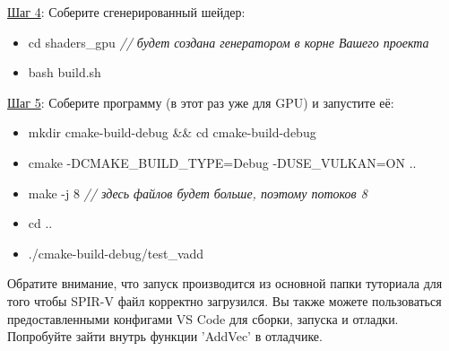 \documentclass[11pt,fleqn,english,russian]{report} %
\begin{document}
\vspace*{5px}
\noindent\underline{Шаг 4}: Соберите сгенерированный шейдер:
\begin{itemize}
\item cd shaders\_gpu \textit{// будет создана генератором в корне Вашего проекта} 
\item bash build.sh
\end{itemize}

\vspace*{5px}
\noindent\underline{Шаг 5}: Соберите программу (в этот раз уже для GPU) и запустите её:
\begin{itemize}
	\item mkdir cmake-build-debug \&\& cd cmake-build-debug
	\item cmake -DCMAKE\_BUILD\_TYPE=Debug -DUSE\_VULKAN=ON ..
	\item make -j 8 \textit{// здесь файлов будет больше, поэтому потоков 8}
	\item cd ..
	\item ./cmake-build-debug/test\_vadd 
\end{itemize}

Обратите внимание, что запуск производится из основной папки туториала для того чтобы SPIR-V файл корректно загрузился. Вы также можете пользоваться предоставленными конфигами VS Code для сборки, запуска и отладки. Попробуйте зайти внутрь функции 'AddVec' в отладчике.


\end{document}

